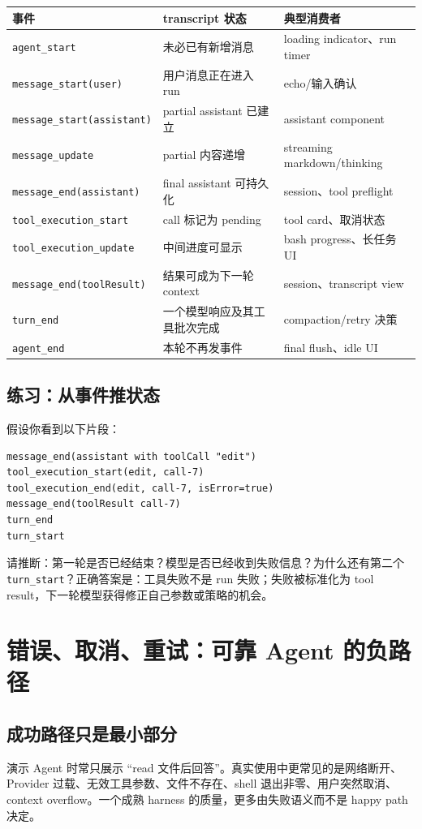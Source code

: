 \documentclass[UTF8,openany,11pt]{ctexbook}
\begin{document}
\begin{longtable}{p{}p{}p{}}
\toprule
事件 & transcript 状态 & 典型消费者\\
\midrule
\texttt{agent\_start} & 未必已有新增消息 & loading indicator、run timer\\
\texttt{message\_start(user)} & 用户消息正在进入 run & echo/输入确认\\
\texttt{message\_start(assistant)} & partial assistant 已建立 & assistant component\\
\texttt{message\_update} & partial 内容递增 & streaming markdown/thinking\\
\texttt{message\_end(assistant)} & final assistant 可持久化 & session、tool preflight\\
\texttt{tool\_execution\_start} & call 标记为 pending & tool card、取消状态\\
\texttt{tool\_execution\_update} & 中间进度可显示 & bash progress、长任务 UI\\
\texttt{message\_end(toolResult)} & 结果可成为下一轮 context & session、transcript view\\
\texttt{turn\_end} & 一个模型响应及其工具批次完成 & compaction/retry 决策\\
\texttt{agent\_end} & 本轮不再发事件 & final flush、idle UI\\
\bottomrule
\end{longtable}

\section{练习：从事件推状态}
假设你看到以下片段：
\begin{Verbatim}[fontsize=\small]
message_end(assistant with toolCall "edit")
tool_execution_start(edit, call-7)
tool_execution_end(edit, call-7, isError=true)
message_end(toolResult call-7)
turn_end
turn_start
\end{Verbatim}
请推断：第一轮是否已经结束？模型是否已经收到失败信息？为什么还有第二个 \texttt{turn\_start}？正确答案是：工具失败不是 run 失败；失败被标准化为 tool result，下一轮模型获得修正自己参数或策略的机会。

\chapter{错误、取消、重试：可靠 Agent 的负路径}

\section{成功路径只是最小部分}
演示 Agent 时常只展示 ``read 文件后回答''。真实使用中更常见的是网络断开、Provider 过载、无效工具参数、文件不存在、shell 退出非零、用户突然取消、context overflow。一个成熟 harness 的质量，更多由失败语义而不是 happy path 决定。
\end{document}
